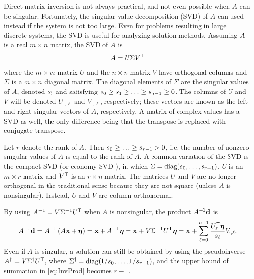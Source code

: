 Direct matrix inversion is not always practical, and not even possible when $A$ can be singular. Fortunately, the singular value decomposition (SVD) of $A$ can used instead if the system is not too large. Even for problems resulting in large discrete systems, the SVD is useful for analyzing solution methods.  Assuming $A$ is a real $m \times n$ matrix, the SVD of $A$ is
\begin{equation}
A = U\Sigma{V}^\mathsf{T}
\label{eq:SVD}
\end{equation}
where the $m \times m$ matrix $U$ and the $n \times n$ matrix $V$ have orthogonal columns and $\Sigma$ is a $m \times n$ diagonal matrix. The diagonal elements of $\Sigma$ are the singular values of $A$, denoted $s_\ell$ and satisfying $s_0 \geq s_1 \geq \ldots \geq s_{n-1} \geq 0$. The columns of $U$ and $V$ will be denoted $U_{\cdot,\ell}$ and $V_{\cdot,\ell}$, respectively; these vectors are known as the left and right singular vectors of $A$, respectively. A matrix of complex values has a SVD as well, the only difference being that the transpose is replaced with conjugate transpose. \par
Let $r$ denote the rank of $A$. Then $s_0 \geq \ldots \geq s_{r-1} > 0$, i.e. the number of nonzero singular values of $A$ is equal to the rank of $A$.  A common variation of the SVD is the compact SVD (or economy SVD \cite{GolubVanLoan2013}), in which $\Sigma = \operatorname{diag}(s_0,\ldots,s_{r-1})$, $U$ is an $m \times r$ matrix and ${V}^\mathsf{T}$ is an $r \times n$ matrix. The matrices $U$ and $V$ are no longer orthogonal in the traditional sense because they are not square (unless $A$ is nonsingular). Instead, $U$ and $V$ are column orthonormal. \par 
By using ${A}^{-1} = V{\Sigma}^{-1}{U}^\mathsf{T}$ when $A$ is nonsingular, the product ${A}^{-1}\mathbf{d}$ is
\begin{equation}
{A}^{-1}\mathbf{d} = {A}^{-1}\left(A\mathbf{x} + \bm{\eta}\right) = \mathbf{x} + {A}^{-1}\bm{\eta} = \mathbf{x} + V{\Sigma}^{-1}{U}^\mathsf{T}\bm{\eta} = \mathbf{x} + \sum_{\ell = 0}^{n-1} \frac{{U}^\mathsf{T}_\ell\bm{\eta}}{s_\ell}V_{\cdot,\ell}. 
\label{eq:InvProd}
\end{equation}
Even if $A$ is singular, a solution can still be obtained by using the pseudoinverse ${A}^\dagger = V{\Sigma}^\dagger{U}^\mathsf{T}$, where ${\Sigma}^\dagger = \operatorname{diag}(1/s_0,\ldots,1/s_{r-1})$, and the upper bound of summation in \eqref{eq:InvProd} becomes $r-1$. 
